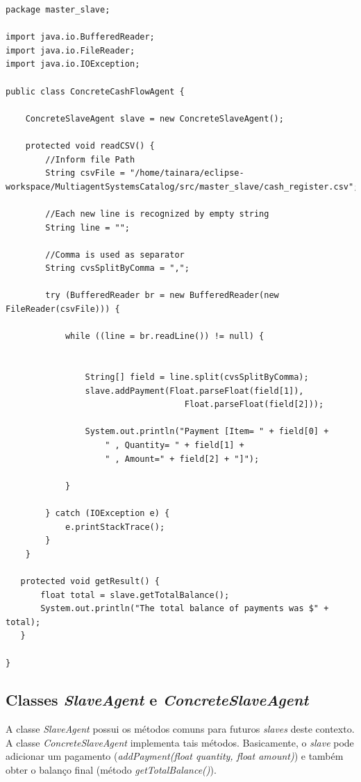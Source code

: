 \begin{lstlisting}
package master_slave;

import java.io.BufferedReader;
import java.io.FileReader;
import java.io.IOException;

public class ConcreteCashFlowAgent {

	ConcreteSlaveAgent slave = new ConcreteSlaveAgent();
	
	protected void readCSV() {
    	//Inform file Path
        String csvFile = "/home/tainara/eclipse-workspace/MultiagentSystemsCatalog/src/master_slave/cash_register.csv";
        
        //Each new line is recognized by empty string
        String line = "";
        
        //Comma is used as separator
        String cvsSplitByComma = ","; 

        try (BufferedReader br = new BufferedReader(new FileReader(csvFile))) {

            while ((line = br.readLine()) != null) {

                
                String[] field = line.split(cvsSplitByComma);
                slave.addPayment(Float.parseFloat(field[1]), 
                					Float.parseFloat(field[2]));
                
                System.out.println("Payment [Item= " + field[0] + 
					" , Quantity= " + field[1] + 
					" , Amount=" + field[2] + "]");
                
            }

        } catch (IOException e) {
            e.printStackTrace();
        }
	}
        
   protected void getResult() {
	   float total = slave.getTotalBalance();	
	   System.out.println("The total balance of payments was $" + total);
   }

}
\end{lstlisting}

\subsection{Classes \textit{SlaveAgent} e \textit{ConcreteSlaveAgent}}

A classe \textit{SlaveAgent} possui os métodos comuns para futuros \textit{slaves} deste contexto. A classe \textit{ConcreteSlaveAgent} implementa tais métodos. Basicamente, o \textit{slave} pode adicionar um pagamento (\textit{addPayment(float quantity, float amount)}) e também obter o balanço final (método \textit{getTotalBalance()}). 

